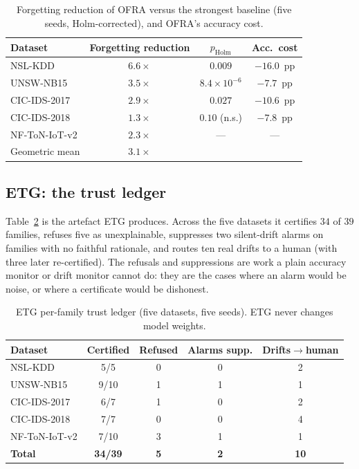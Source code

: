 \documentclass[conference]{IEEEtran}
\begin{document}
\begin{table}[t]
\caption{Forgetting reduction of OFRA versus the strongest baseline
(five seeds, Holm-corrected), and OFRA's accuracy cost.}
\label{tab:forget}
\centering\small\setlength{\tabcolsep}{3pt}
\begin{tabular}{lccc}
\toprule
Dataset & Forgetting reduction & $p_{\mathrm{Holm}}$ & Acc.\ cost \\
\midrule
NSL-KDD        & $6.6\times$ & $0.009$   & $-16.0$~pp \\
UNSW-NB15      & $3.5\times$ & $8.4\!\times\!10^{-6}$ & $-7.7$~pp \\
CIC-IDS-2017   & $2.9\times$ & $0.027$   & $-10.6$~pp \\
CIC-IDS-2018   & $1.3\times$ & $0.10$ (n.s.) & $-7.8$~pp \\
NF-ToN-IoT-v2  & $2.3\times$ & ---       & --- \\
\midrule
Geometric mean & $\mathbf{3.1\times}$ & & \\
\bottomrule
\end{tabular}
\end{table}

\subsection{ETG: the trust ledger}
\label{sec:results-etg}

Table~\ref{tab:etg} is the artefact ETG produces. Across the five datasets it
certifies $34$ of $39$ families, refuses five as unexplainable, suppresses two
silent-drift alarms on families with no faithful rationale, and routes ten real
drifts to a human (with three later re-certified). The refusals and suppressions
are work a plain accuracy monitor or drift monitor cannot do: they are the cases
where an alarm would be noise, or where a certificate would be dishonest.

\begin{table}[t]
\caption{ETG per-family trust ledger (five datasets, five seeds). ETG never
changes model weights.}
\label{tab:etg}
\centering\scriptsize\setlength{\tabcolsep}{2pt}
\begin{tabular}{lcccc}
\toprule
Dataset & Certified & Refused & Alarms supp. & Drifts$\to$human \\
\midrule
NSL-KDD        & 5/5  & 0 & 0 & 2 \\
UNSW-NB15      & 9/10 & 1 & 1 & 1 \\
CIC-IDS-2017   & 6/7  & 1 & 0 & 2 \\
CIC-IDS-2018   & 7/7  & 0 & 0 & 4 \\
NF-ToN-IoT-v2  & 7/10 & 3 & 1 & 1 \\
\midrule
\textbf{Total} & \textbf{34/39} & \textbf{5} & \textbf{2} & \textbf{10} \\
\bottomrule
\end{tabular}
\end{table}
\end{document}
